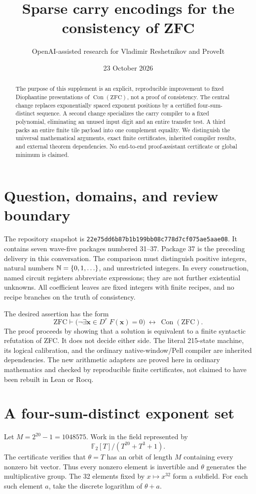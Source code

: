 \documentclass[11pt]{article}
\title{Sparse carry encodings for the consistency of ZFC}
\author{OpenAI-assisted research for Vladimir Reshetnikov and ProveIt}
\date{23 October 2026}
\newcommand{\Con}{\operatorname{Con}}
\begin{document}
\maketitle
\begin{abstract}
The purpose of this supplement is an explicit, reproducible improvement to fixed Diophantine presentations of $\Con(\mathrm{ZFC})$, not a proof of consistency. The central change replaces exponentially spaced exponent positions by a certified four-sum-distinct sequence. A second change specializes the carry compiler to a fixed polynomial, eliminating an unused input digit and an entire transfer test. A third packs an entire finite tile payload into one complement equality. We distinguish the universal mathematical arguments, exact finite certificates, inherited compiler results, and external theorem dependencies. No end-to-end proof-assistant certificate or global minimum is claimed.
\end{abstract}
\section{Question, domains, and review boundary}
The repository snapshot is
\texttt{22e75dd6b87b1b199bb08c778d7cf075ae5aae08}.
It contains seven wave-five packages numbered 31--37. Package 37 is the preceding delivery in this conversation. The comparison must distinguish positive integers, natural numbers $\mathbb N=\{0,1,\ldots\}$, and unrestricted integers. In every construction, named circuit registers abbreviate expressions; they are not further existential unknowns. All coefficient leaves are fixed integers with finite recipes, and no recipe branches on the truth of consistency.

The desired assertion has the form
\[
\mathrm{ZFC}\vdash
\bigl(\neg\exists\mathbf x\in D^r\; F(\mathbf x)=0\bigr)
\ \longleftrightarrow\ \Con(\mathrm{ZFC}).
\]
The proof proceeds by showing that a solution is equivalent to a finite syntactic refutation of ZFC. It does not decide either side. The literal 215-state machine, its logical calibration, and the ordinary native-window/Pell compiler are inherited dependencies. The new arithmetic adapters are proved here in ordinary mathematics and checked by reproducible finite certificates, not claimed to have been rebuilt in Lean or Rocq.

\section{A four-sum-distinct exponent set}
\label{sec:b4}
Let $M=2^{20}-1=1048575$. Work in the field represented by
\[
\mathbb F_2[T]/(T^{20}+T^3+1).
\]
The certificate verifies that $\theta=T$ has an orbit of length $M$ containing every nonzero bit vector. Thus every nonzero element is invertible and $\theta$ generates the multiplicative group. The 32 elements fixed by $x\mapsto x^{32}$ form a subfield. For each such element $a$, take the discrete logarithm of $\theta+a$.
\end{document}
